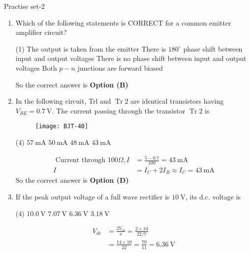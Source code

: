 \newpage
\begin{abox}
	Practise set-2
	\end{abox}
\begin{enumerate}
	\item Which of the following statements is CORRECT for a common emitter amplifier circuit?
{	}
\begin{tasks}(1)
\task[\textbf{A.}] The output is taken from the emitter
\task[\textbf{B.}] There is $180^{\circ}$ phase shift between input and output voltages
\task[\textbf{C.}] There is no phase shift between input and output voltages
\task[\textbf{D.}] Both $p-n$ junctions are forward biased
\end{tasks}
\begin{answer}
So the correct answer is \textbf{Option (B)}
\end{answer}
\item 	In the following circuit, Trl and $\operatorname{Tr} 2$ are identical transistors having $V_{B E}=0.7 \mathrm{~V}$. The current passing through the transistor $\operatorname{Tr} 2$ is
{}
\begin{figure}[H]
\centering
\texttt{[image: BJT-40]}
\end{figure}
\begin{tasks}(4)
\task[\textbf{A.}] $57 \mathrm{~mA}$
\task[\textbf{B.}] $50 \mathrm{~mA}$
\task[\textbf{C.}] $48 \mathrm{~mA}$
\task[\textbf{D.}] $43 \mathrm{~mA}$
\end{tasks}
\begin{answer}
\begin{align*}
\text{	Current through }100 \Omega, I&=\frac{5-0.7}{100}=43 \mathrm{~mA}\\
I&=I_{C}+2 I_{B} \approx I_{C}=43 \mathrm{~mA}
\end{align*}
So the correct answer is \textbf{Option (D)}
\end{answer}
	\item If the peak output voltage of a full wave rectifier is $10 \mathrm{~V}$, its d.c. voltage is
{	}
\begin{tasks}(4)
\task[\textbf{A.}] $10.0 \mathrm{~V}$
\task[\textbf{B.}] $7.07 \mathrm{~V}$
\task[\textbf{C.}] $6.36 \mathrm{~V}$
\task[\textbf{D.}] $3.18 \mathrm{~V}$
\end{tasks}
\begin{answer}
\begin{align*}
V_{d c}&=\frac{2 V_{m}}{\pi}=\frac{2 \times 10}{22 / 7}\\&=\frac{14 \times 10}{22}=\frac{70}{11}=6.36 \mathrm{~V}

\end{align*}
\end{answer}
\end{enumerate}
